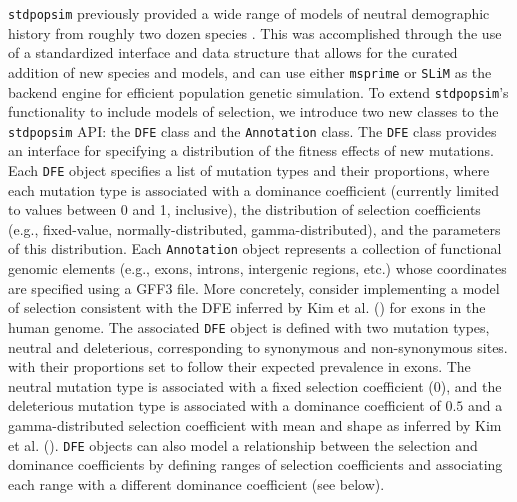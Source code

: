 \documentclass[hidelinks]{article}
\newcommand{\stdpopsim}{\texttt{stdpopsim}\xspace}
\newcommand{\slim}{\texttt{SLiM}\xspace}
\newcommand{\msprime}{\texttt{msprime}\xspace}
\begin{document}
    \stdpopsim previously provided a wide range of models of neutral
    demographic history from roughly two dozen species \citep{lauterbur2023expanding}.
    This was accomplished through the use of a standardized interface
    and data structure that allows for the curated addition of new
    species and models, and can use either
    \msprime \citep{Baumdicker2022} or \slim \citep{haller2019slim}
    as the backend engine for efficient population genetic simulation.
    To extend \stdpopsim's functionality to include models of selection, 
    we introduce two new classes
    to the \stdpopsim API: the \texttt{DFE} class and the \texttt{Annotation} class.
    The \texttt{DFE} class provides an interface for specifying
    a distribution of the fitness effects of new mutations.
    Each \texttt{DFE} object specifies a list of mutation types and
    their proportions, where 
    each mutation type is associated with a dominance coefficient
    (currently limited to values between 0 and 1, inclusive),
    the distribution of selection coefficients (e.g., fixed-value, normally-distributed, gamma-distributed),
    and the parameters of this distribution.
    Each \texttt{Annotation} object represents a collection of functional
    genomic elements (e.g., exons, introns, intergenic regions, etc.)
    whose coordinates are specified using a GFF3 file.      
    More concretely, consider implementing a model of selection consistent with the
    DFE inferred by Kim et al. (\citeyear{kim2017inference}) for exons in the human genome.
    The associated \texttt{DFE} object is defined with two mutation types,
    neutral and deleterious, corresponding to synonymous and non-synonymous sites.
    with their proportions set to follow their expected prevalence in exons. 
    The neutral mutation type is associated with a fixed selection coefficient (0),
    and the deleterious mutation type is associated with a dominance coefficient of $0.5$ and
    a gamma-distributed selection coefficient
    with mean and shape as inferred by Kim et al. (\citeyear{kim2017inference}).
    \texttt{DFE} objects can also model a relationship between the selection and dominance coefficients \citep{huber2018gene}
    by defining ranges of selection coefficients and associating each range with a different dominance coefficient (see below).
    
\end{document}
